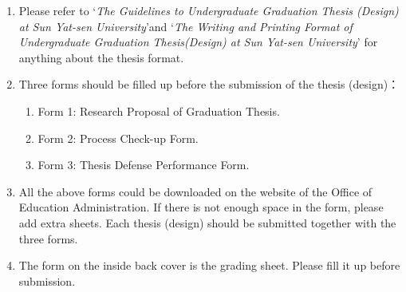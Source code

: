 \begin{enumerate}[label=\arabic*.,leftmargin=*]
  \item Please refer to ‘\textit{The Guidelines to Undergraduate Graduation Thesis (Design) at Sun Yat-sen University}’and ‘\textit{The Writing and Printing Format of Undergraduate Graduation Thesis(Design) at Sun Yat-sen University}’ for anything about the thesis format.
  \item Three forms should be filled up before the submission of the thesis (design)：
  \begin{enumerate}[align=left,leftmargin=!,labelsep=0mm,label=（\arabic*）]
    \item Form 1: Research Proposal of Graduation Thesis.
    \item Form 2: Process Check-up Form.
    \item Form 3: Thesis Defense Performance Form.
  \end{enumerate}
  \item All the above forms could be downloaded on the website of the Office of Education Administration. If there is not enough space in the form, please add extra sheets. Each thesis (design) should be submitted together with the three forms.
  \item The form on the inside back cover is the grading sheet. Please fill it up before submission.
\end{enumerate}

